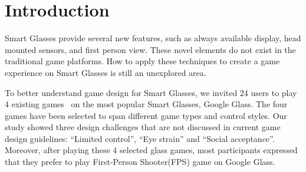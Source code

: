\documentclass{sig-alternate}
\begin{document}


\section{Introduction}

Smart Glasses provide several new features, such as always available display, head mounted sensors, and first person view. These novel elements do not exist in the traditional game platforms. How to apply these techniques to create a  game experience on Smart Glasses is still an unexplored area.

To better understand game design for Smart Glasses, we invited 24 users to play 4 existing games~\cite{minigame} on the most popular Smart Glasses, Google Glass. The four games have been selected to span different game types and control styles. Our study showed three design challenges that are not discussed in current game design guidelines: ``Limited control'', ``Eye strain'' and ``Social acceptance''. Moreover, after playing these 4 selected glass games, most participants expressed that they prefer to play First-Person Shooter(FPS) game on Google Glass. 

\end{document}

